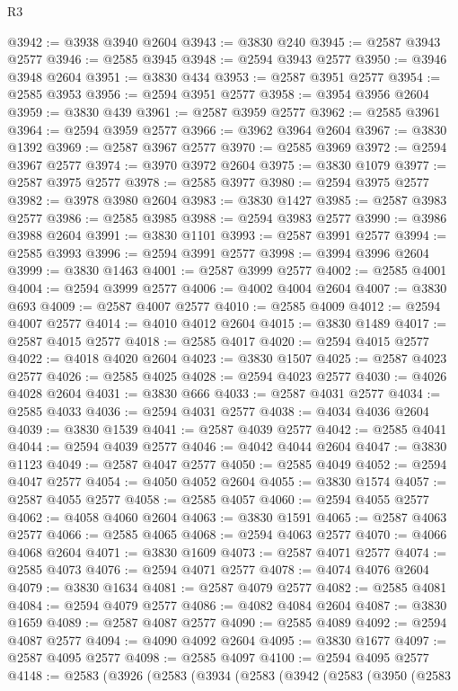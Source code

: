 \begin{lexlean}{R3}
\begin{coremodule}
@3942 := @3938 @3940 @2604
@3943 := @3830 @240
@3945 := @2587 @3943 @2577
@3946 := @2585 @3945
@3948 := @2594 @3943 @2577
@3950 := @3946 @3948 @2604
@3951 := @3830 @434
@3953 := @2587 @3951 @2577
@3954 := @2585 @3953
@3956 := @2594 @3951 @2577
@3958 := @3954 @3956 @2604
@3959 := @3830 @439
@3961 := @2587 @3959 @2577
@3962 := @2585 @3961
@3964 := @2594 @3959 @2577
@3966 := @3962 @3964 @2604
@3967 := @3830 @1392
@3969 := @2587 @3967 @2577
@3970 := @2585 @3969
@3972 := @2594 @3967 @2577
@3974 := @3970 @3972 @2604
@3975 := @3830 @1079
@3977 := @2587 @3975 @2577
@3978 := @2585 @3977
@3980 := @2594 @3975 @2577
@3982 := @3978 @3980 @2604
@3983 := @3830 @1427
@3985 := @2587 @3983 @2577
@3986 := @2585 @3985
@3988 := @2594 @3983 @2577
@3990 := @3986 @3988 @2604
@3991 := @3830 @1101
@3993 := @2587 @3991 @2577
@3994 := @2585 @3993
@3996 := @2594 @3991 @2577
@3998 := @3994 @3996 @2604
@3999 := @3830 @1463
@4001 := @2587 @3999 @2577
@4002 := @2585 @4001
@4004 := @2594 @3999 @2577
@4006 := @4002 @4004 @2604
@4007 := @3830 @693
@4009 := @2587 @4007 @2577
@4010 := @2585 @4009
@4012 := @2594 @4007 @2577
@4014 := @4010 @4012 @2604
@4015 := @3830 @1489
@4017 := @2587 @4015 @2577
@4018 := @2585 @4017
@4020 := @2594 @4015 @2577
@4022 := @4018 @4020 @2604
@4023 := @3830 @1507
@4025 := @2587 @4023 @2577
@4026 := @2585 @4025
@4028 := @2594 @4023 @2577
@4030 := @4026 @4028 @2604
@4031 := @3830 @666
@4033 := @2587 @4031 @2577
@4034 := @2585 @4033
@4036 := @2594 @4031 @2577
@4038 := @4034 @4036 @2604
@4039 := @3830 @1539
@4041 := @2587 @4039 @2577
@4042 := @2585 @4041
@4044 := @2594 @4039 @2577
@4046 := @4042 @4044 @2604
@4047 := @3830 @1123
@4049 := @2587 @4047 @2577
@4050 := @2585 @4049
@4052 := @2594 @4047 @2577
@4054 := @4050 @4052 @2604
@4055 := @3830 @1574
@4057 := @2587 @4055 @2577
@4058 := @2585 @4057
@4060 := @2594 @4055 @2577
@4062 := @4058 @4060 @2604
@4063 := @3830 @1591
@4065 := @2587 @4063 @2577
@4066 := @2585 @4065
@4068 := @2594 @4063 @2577
@4070 := @4066 @4068 @2604
@4071 := @3830 @1609
@4073 := @2587 @4071 @2577
@4074 := @2585 @4073
@4076 := @2594 @4071 @2577
@4078 := @4074 @4076 @2604
@4079 := @3830 @1634
@4081 := @2587 @4079 @2577
@4082 := @2585 @4081
@4084 := @2594 @4079 @2577
@4086 := @4082 @4084 @2604
@4087 := @3830 @1659
@4089 := @2587 @4087 @2577
@4090 := @2585 @4089
@4092 := @2594 @4087 @2577
@4094 := @4090 @4092 @2604
@4095 := @3830 @1677
@4097 := @2587 @4095 @2577
@4098 := @2585 @4097
@4100 := @2594 @4095 @2577
@4148 := @2583
    (@3926
      (@2583
        (@3934
          (@2583
            (@3942
              (@2583
                (@3950
                  (@2583

\end{coremodule}
\end{lexlean}
